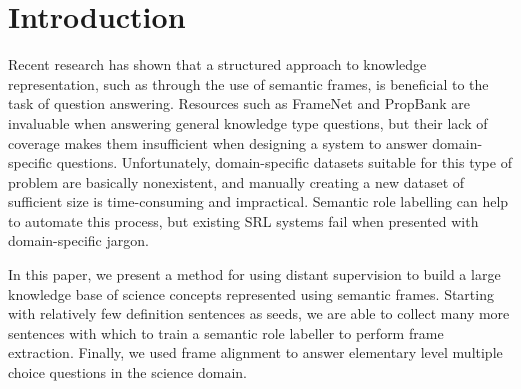 \section{Introduction}

Recent research has shown that a structured approach to knowledge representation, such as through the use of semantic frames, is beneficial to the task of question answering. Resources such as FrameNet and PropBank are invaluable when answering general knowledge type questions, but their lack of coverage makes them insufficient when designing a system to answer domain-specific questions. Unfortunately, domain-specific datasets suitable for this type of problem are basically nonexistent, and manually creating a new dataset of sufficient size is time-consuming and impractical. Semantic role labelling can help to automate this process, but existing SRL systems fail when presented with domain-specific jargon.

In this paper, we present a method for using distant supervision to build a large knowledge base of science concepts represented using semantic frames. Starting with relatively few definition sentences as seeds, we are able to collect many more sentences with which to train a semantic role labeller to perform frame extraction. Finally, we used frame alignment to answer elementary level multiple choice questions in the science domain.

